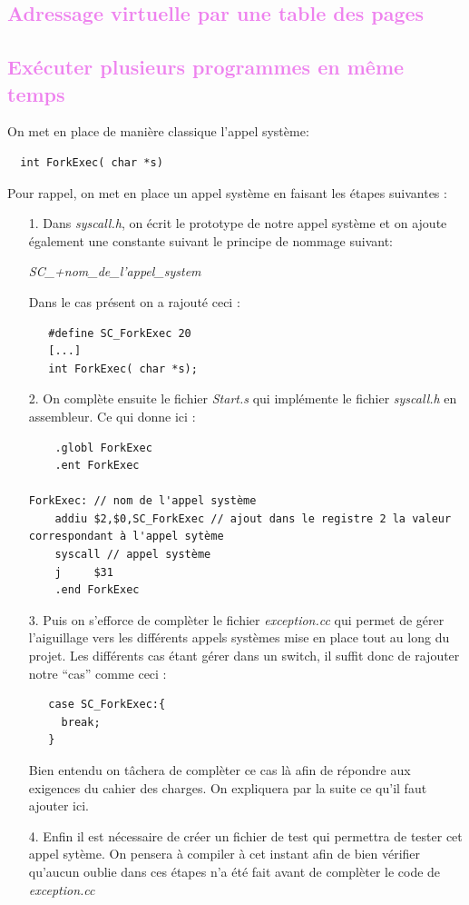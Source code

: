 \documentclass[a4paper,10pt]{article}
\begin{document}
  \textcolor{Violet}{\section{Adressage virtuelle par une table des pages}}
  \textcolor{Violet}{\section{Exécuter plusieurs programmes en même temps}}
  On met en place de manière classique l'appel système: 
  \begin{lstlisting}
  int ForkExec( char *s)
  \end{lstlisting}
  Pour rappel, on met en place un appel système en faisant les étapes suivantes :
  \begin{itemize}
   \item[1.] Dans \emph{syscall.h}, on écrit le prototype de notre appel système et on ajoute également une constante suivant le principe de nommage suivant:
   \begin{center}
   \emph{SC\_+nom\_de\_l'appel\_system}
   \end{center}
  Dans le cas présent on a rajouté ceci : 
  \begin{lstlisting}
   #define SC_ForkExec 20
   [...]
   int ForkExec( char *s);
  \end{lstlisting}
  \item[2.] On complète ensuite le fichier \emph{Start.s} qui implémente le fichier \emph{syscall.h} en assembleur. Ce qui donne ici :
  \begin{lstlisting}
   	.globl ForkExec
	.ent ForkExec

ForkExec: // nom de l'appel système
	addiu $2,$0,SC_ForkExec // ajout dans le registre 2 la valeur correspondant à l'appel sytème
	syscall // appel système
	j     $31
	.end ForkExec
  \end{lstlisting}
  \item[3.] Puis on s'efforce de complèter le fichier \emph{exception.cc} qui permet de gérer l'aiguillage vers les différents appels systèmes mise en place 
  tout au long du projet. Les différents cas étant gérer dans un switch, il suffit donc de rajouter notre ``cas'' comme ceci :
  \begin{lstlisting}
   case SC_ForkExec:{
     break;
   }
  \end{lstlisting}
  Bien entendu on tâchera de complèter ce cas là afin de répondre aux exigences du cahier des charges. On expliquera par la suite ce qu'il faut ajouter ici.
  
  \item[4.] Enfin il est nécessaire de créer un fichier de test qui permettra de tester cet appel sytème. On pensera à compiler à cet instant afin de bien 
  vérifier qu'aucun oublie dans ces étapes n'a été fait avant de complèter le code de \emph{exception.cc}
  \end{itemize}  
\end{document}
